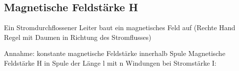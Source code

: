 \subsection*{Magnetische Feldstärke H}
    Ein Stromdurchflossener Leiter baut ein magnetisches Feld auf (Rechte Hand Regel mit Daumen in Richtung des Stromflusses)

    Annahme: konstante magnetische Feldstärke innerhalb Spule
    Magnetische Feldstärke H in Spule der Länge l mit n Windungen bei Stromstärke I:
